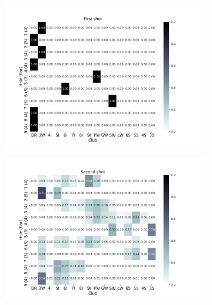 \documentclass{kththesis}
\begin{document}
\begin{figure}
    \centering
    \begin{subfigure}{\textwidth}
    \centering
    \includegraphics[height=0.3\textheight]{AgentClubChoices/DDDQN_Pebble_Club_Choices_First_Shot.png} 
    \end{subfigure}
    \begin{subfigure}{\textwidth}
    \centering
    \includegraphics[height=0.3\textheight]{AgentClubChoices/DDDQN_Pebble_Club_Choices_Second_Shot.png} 
    \end{subfigure}
    \begin{subfigure}{\textwidth}
    \centering

\end{subfigure}
\end{figure}
\end{document}
